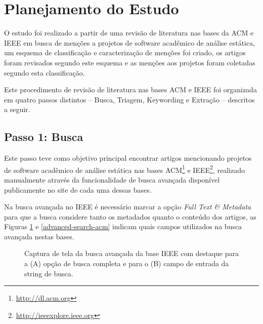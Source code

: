 
\section{Planejamento do Estudo} \label{estudo2:planejamento} %

O estudo foi realizado a partir de uma revisão de literatura nas bases da ACM e
IEEE em busca de menções a projetos de software acadêmico de análise estática,
um esquema de classificação e caracterização de menções foi criado, os artigos
foram revisados segundo este esquema e as menções aos projetos foram coletadas
segundo esta classificação.

Este procedimento de revisão de literatura nas bases ACM e IEEE foi organizada
em quatro passos distintos -- Busca, Triagem, Keywording e Extração -- descritos
a seguir.

\subsection{Passo 1: Busca}


Este passo teve como objetivo principal encontrar artigos mencionando projetos
de software acadêmico de análise estática nas bases
ACM\footnote{\url{http://dl.acm.org}} e
IEEE\footnote{\url{http://ieeexplore.ieee.org}}, realizado manualmente através
da funcionalidade de busca avançada disponível publicamente no site de cada uma
dessas bases.

Na busca avançada no IEEE é necessário marcar a opção {\it Full Text \& Metadata}
para que a busca considere tanto os metadados quanto o conteúdo dos artigos, as Figuras
\ref{advanced-search-ieee} e \ref{advanced-search-acm} indicam quais campos
utilizados na busca avançada nestas bases.

\begin{figure}[h]
  \center
  \caption{Captura de tela da busca avançada da base IEEE com destaque para a (A) opção de busca completa e para o (B) campo de entrada da string de busca.}
  \label{advanced-search-ieee}
\end{figure}

